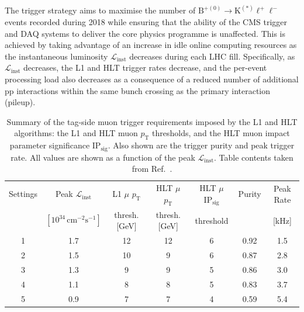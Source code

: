 \documentclass{webofc}
\newcommand{\ellell}{\ensuremath{\ell^+\ell^-}\xspace}
\newcommand{\btokstar}{\ensuremath{\textrm{B}^{+(0)}{\rightarrow}\textrm{K}^{(*)}}\xspace}
\newcommand{\btokstarll}{\ensuremath{\btokstar\ellell}\xspace}
\newcommand{\pt}{\ensuremath{p_\textrm{T}}\xspace}
\newcommand{\instlumi}{\ensuremath{\mathcal{L}_{\textrm{inst}}}\xspace}
\newcommand{\cms}{\ensuremath{\,\textrm{cm}^{-2}\textrm{s}^{-1}}\xspace}
\newcommand{\ipsig}{\ensuremath{\textrm{IP}_{\textrm{sig}}}\xspace}
\begin{document}
The trigger strategy aims to maximise the number of \btokstarll events
recorded during 2018 while ensuring that the ability of the CMS
trigger and DAQ systems to deliver the core physics programme is
unaffected. This is achieved by taking advantage of an increase in
idle online computing resources as the instantaneous luminosity
\instlumi decreases during each LHC fill. Specifically, as \instlumi
decreases, the L1 and HLT trigger rates decrease, and the per-event
processing load also decreases as a consequence of a reduced number of
additional pp interactions within the same bunch crossing as the
primary interaction (pileup).

\begin{table}[!b]
  \small%
  \centering 
  \caption{Summary of the tag-side muon trigger requirements
    imposed by the L1 and HLT algorithms: the L1 and HLT muon \pt
    thresholds, and the HLT muon impact parameter significance
    \ipsig. Also shown are the trigger purity and peak trigger
    rate. All values are shown as a function of the peak \instlumi.
    Table contents taken from Ref.~\cite{bpark-dps}.} 
  \label{tab:1}
  \begin{tabular}{ccccccc}
    \hline
    Settings & Peak \instlumi  & L1 $\mu$ \pt  & HLT $\mu$ \pt & HLT $\mu$ \ipsig & Purity & Peak Rate \\
             & $[10^{34}\cms]$ & thresh. [GeV] & thresh. [GeV] & threshold        &        & [kHz]     \\
    \hline
    1        & 1.7             & 12            & 12            & 6                & 0.92   & 1.5       \\
    2        & 1.5             & 10            & 9             & 6                & 0.87   & 2.8       \\
    3        & 1.3             & 9             & 9             & 5                & 0.86   & 3.0       \\
    4        & 1.1             & 8             & 8             & 5                & 0.83   & 3.7       \\
    5        & 0.9             & 7             & 7             & 4                & 0.59   & 5.4       \\
    \hline
  \end{tabular}
\end{table}
\end{document}
